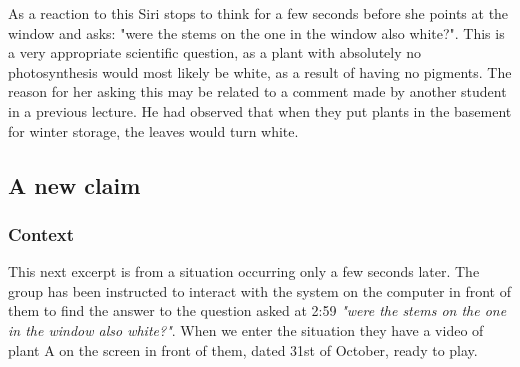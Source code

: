 As a reaction to this Siri stops to think for a few seconds before she points at the window and asks: "were the stems on the one in the window also white?". This is a very appropriate scientific question, as a plant with absolutely no photosynthesis would most likely be white, as a result of having no pigments. The reason for her asking this may be related to a comment made by another student in a previous lecture. He had observed that when they put plants in the basement for winter storage, the leaves would turn white. 

\subsection{A new claim}
\subsubsection*{Context}
This next excerpt is from a situation occurring only a few seconds later. The group has been instructed to interact with the system on the computer in front of them to find the answer to the question asked at 2:59 \emph{"were the stems on the one in the window also white?"}. When we enter the situation they have a video of plant A on the screen in front of them, dated 31st of October, ready to play. 

